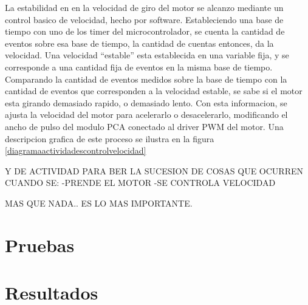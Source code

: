 La estabilidad en en la velocidad de giro del motor se alcanzo mediante un control basico de velocidad, hecho por software. Estableciendo una base de tiempo con uno de los timer del microcontrolador, se cuenta la cantidad de eventos sobre esa base de tiempo, la cantidad de cuentas entonces, da la velocidad. Una velocidad ``estable'' esta establecida en una variable fija, y se corresponde a una cantidad fija de eventos en la misma base de tiempo. Comparando la cantidad de eventos medidos sobre la base de tiempo con la cantidad de eventos que corresponden a la velocidad estable, se sabe si el motor esta girando demasiado rapido, o demasiado lento. Con esta informacion, se ajusta la velocidad del motor para acelerarlo o desacelerarlo, modificando el ancho de pulso del modulo PCA conectado al driver PWM del motor. Una descripcion grafica de este proceso se ilustra en la figura \ref{diagramaactividadescontrolvelocidad}


Y DE ACTIVIDAD PARA BER LA SUCESION DE COSAS QUE OCURREN CUANDO SE:
-PRENDE EL MOTOR
-SE CONTROLA VELOCIDAD

MAS QUE NADA.. ES LO MAS IMPORTANTE.


\section{Pruebas} %
\label{sec:pruebas}


\section{Resultados} %
\label{sec:resultados}


